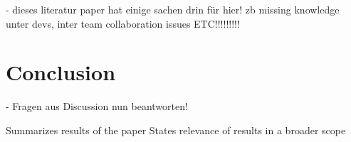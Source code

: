 \documentclass[conference]{IEEEtran}
\begin{document}
- dieses literatur paper hat einige sachen drin für hier! zb missing knowledge unter devs, inter team collaboration issues ETC!!!!!!!!!

\section{Conclusion}

- Fragen aus Discussion nun beantworten!

Summarizes results of the paper
 States relevance of results in a broader scope





\end{document}
